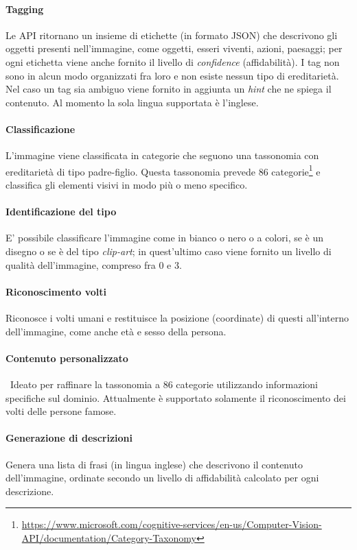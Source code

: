 \paragraph{Tagging} Le API ritornano un insieme di etichette (in formato JSON) che descrivono gli oggetti presenti nell'immagine, come oggetti, esseri viventi, azioni, paesaggi; per ogni etichetta viene anche fornito il livello di \textit{confidence} (affidabilità). I tag non sono in alcun modo organizzati fra loro e non esiste nessun tipo di ereditarietà.
Nel caso un tag sia ambiguo viene fornito in aggiunta un \textit{hint} che ne spiega il contenuto.
Al momento la sola lingua supportata è l'inglese.

\paragraph{Classificazione} L'immagine viene classificata in categorie che seguono una tassonomia con ereditarietà di tipo padre-figlio. Questa tassonomia prevede 86 categorie\footnote{\url{https://www.microsoft.com/cognitive-services/en-us/Computer-Vision-API/documentation/Category-Taxonomy}} e classifica gli elementi visivi in modo più o meno specifico.

\paragraph{Identificazione del tipo} E' possibile classificare l'immagine come in bianco o nero o a colori, se è un disegno o se è del tipo \textit{clip-art}; in quest'ultimo caso viene fornito un livello di qualità dell'immagine, compreso fra 0 e 3.

\paragraph{Riconoscimento volti} Riconosce i volti umani e restituisce la posizione (coordinate) di questi all'interno dell'immagine, come anche età e sesso della persona.

\paragraph{Contenuto personalizzato} Ideato per raffinare la tassonomia a 86 categorie utilizzando informazioni specifiche sul dominio. Attualmente è supportato solamente il riconoscimento dei volti delle persone famose.

\paragraph{Generazione di descrizioni} Genera una lista di frasi (in lingua inglese) che descrivono il contenuto dell'immagine, ordinate secondo un livello di affidabilità calcolato per ogni descrizione.

